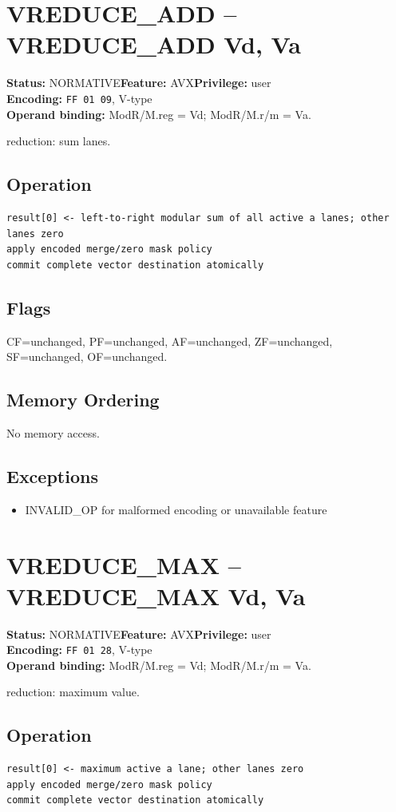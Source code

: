 \documentclass[10pt]{article}
\begin{document}
\section{VREDUCE\_ADD -- VREDUCE\_ADD Vd, Va}
\textbf{Status:} NORMATIVE\quad \textbf{Feature:} AVX\quad \textbf{Privilege:} user\\
\textbf{Encoding:} \texttt{FF 01 09}, V-type\\
\textbf{Operand binding:} ModR/M.reg = Vd; ModR/M.r/m = Va.

reduction: sum lanes.

\subsection*{Operation}
\begin{lstlisting}
result[0] <- left-to-right modular sum of all active a lanes; other lanes zero
apply encoded merge/zero mask policy
commit complete vector destination atomically
\end{lstlisting}
\subsection*{Flags}
CF=unchanged, PF=unchanged, AF=unchanged, ZF=unchanged, SF=unchanged, OF=unchanged.
\subsection*{Memory Ordering}
No memory access.
\subsection*{Exceptions}
\begin{itemize}
\item INVALID\_OP for malformed encoding or unavailable feature
\end{itemize}
\clearpage

\section{VREDUCE\_MAX -- VREDUCE\_MAX Vd, Va}
\textbf{Status:} NORMATIVE\quad \textbf{Feature:} AVX\quad \textbf{Privilege:} user\\
\textbf{Encoding:} \texttt{FF 01 28}, V-type\\
\textbf{Operand binding:} ModR/M.reg = Vd; ModR/M.r/m = Va.

reduction: maximum value.

\subsection*{Operation}
\begin{lstlisting}
result[0] <- maximum active a lane; other lanes zero
apply encoded merge/zero mask policy
commit complete vector destination atomically
\end{lstlisting}
\end{document}
